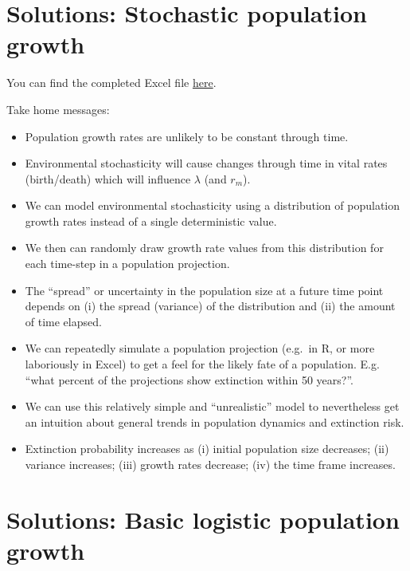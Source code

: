 \documentclass[
  a4paper]{book}
\providecommand{\tightlist}{%
  \setlength{\itemsep}{0pt}\setlength{\parskip}{0pt}}
\begin{document}
\hypertarget{solutions-stochastic-population-growth}{%
\section{Solutions: Stochastic population growth}\label{solutions-stochastic-population-growth}}

You can find the completed Excel file \href{https://www.dropbox.com/s/baao06vi0c0quns/StochasticPopulationGrowth-complete.xlsx?dl=1}{here}.

Take home messages:

\begin{itemize}
\tightlist
\item
  Population growth rates are unlikely to be constant through time.
\item
  Environmental stochasticity will cause changes through time in vital rates (birth/death) which will influence \(\lambda\) (and \(r_m\)).
\item
  We can model environmental stochasticity using a distribution of population growth rates instead of a single deterministic value.
\item
  We then can randomly draw growth rate values from this distribution for each time-step in a population projection.
\item
  The ``spread'' or uncertainty in the population size at a future time point depends on (i) the spread (variance) of the distribution and (ii) the amount of time elapsed.
\item
  We can repeatedly simulate a population projection (e.g.~in R, or more laboriously in Excel) to get a feel for the likely fate of a population. E.g. ``what percent of the projections show extinction within 50 years?''.
\item
  We can use this relatively simple and ``unrealistic'' model to nevertheless get an intuition about general trends in population dynamics and extinction risk.
\item
  Extinction probability increases as (i) initial population size decreases; (ii) variance increases; (iii) growth rates decrease; (iv) the time frame increases.
\end{itemize}

\hypertarget{solutions-basic-logistic-population-growth}{%
\section{Solutions: Basic logistic population growth}\label{solutions-basic-logistic-population-growth}}
\end{document}
